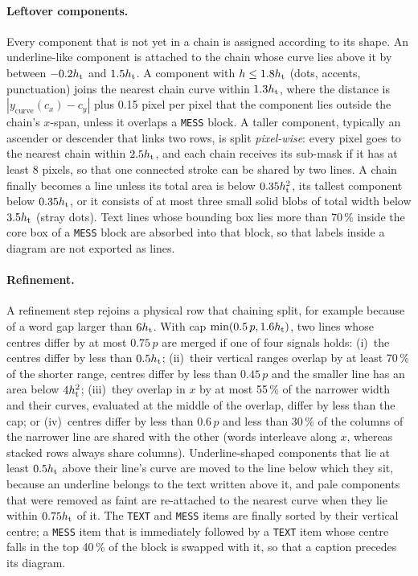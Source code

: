 \paragraph{Leftover components.}
Every component that is not yet in a chain is assigned according to its shape.
An underline-like component is attached to the chain whose curve lies above it by between $-0.2h_{\mathrm{t}}$ and $1.5h_{\mathrm{t}}$.
A component with $h\le1.8h_{\mathrm{t}}$ (dots, accents, punctuation) joins the nearest chain curve within $1.3h_{\mathrm{t}}$, where the distance is $|y_{\mathrm{curve}}(c_x)-c_y|$ plus 0.15 pixel per pixel that the component lies outside the chain's $x$-span, unless it overlaps a \texttt{MESS} block.
A taller component, typically an ascender or descender that links two rows, is split \emph{pixel-wise}: every pixel goes to the nearest chain within $2.5h_{\mathrm{t}}$, and each chain receives its sub-mask if it has at least 8 pixels, so that one connected stroke can be shared by two lines.
A chain finally becomes a line unless its total area is below $0.35h_{\mathrm{t}}^2$, its tallest component below $0.35h_{\mathrm{t}}$, or it consists of at most three small solid blobs of total width below $3.5h_{\mathrm{t}}$ (stray dots).
Text lines whose bounding box lies more than 70\,\% inside the core box of a \texttt{MESS} block are absorbed into that block, so that labels inside a diagram are not exported as lines.

\paragraph{Refinement.}
A refinement step rejoins a physical row that chaining split, for example because of a word gap larger than $6h_{\mathrm{t}}$.
With cap $\min(0.5\,p,1.6h_{\mathrm{t}})$, two lines whose centres differ by at most $0.75\,p$ are merged if one of four signals holds: (i)~the centres differ by less than $0.5h_{\mathrm{t}}$; (ii)~their vertical ranges overlap by at least 70\,\% of the shorter range, centres differ by less than $0.45\,p$ and the smaller line has an area below $4h_{\mathrm{t}}^2$; (iii)~they overlap in $x$ by at most 55\,\% of the narrower width and their curves, evaluated at the middle of the overlap, differ by less than the cap; or (iv)~centres differ by less than $0.6\,p$ and less than 30\,\% of the columns of the narrower line are shared with the other (words interleave along $x$, whereas stacked rows always share columns).
Underline-shaped components that lie at least $0.5h_{\mathrm{t}}$ above their line's curve are moved to the line below which they sit, because an underline belongs to the text written above it, and pale components that were removed as faint are re-attached to the nearest curve when they lie within $0.75h_{\mathrm{t}}$ of it.
The \texttt{TEXT} and \texttt{MESS} items are finally sorted by their vertical centre; a \texttt{MESS} item that is immediately followed by a \texttt{TEXT} item whose centre falls in the top 40\,\% of the block is swapped with it, so that a caption precedes its diagram.



